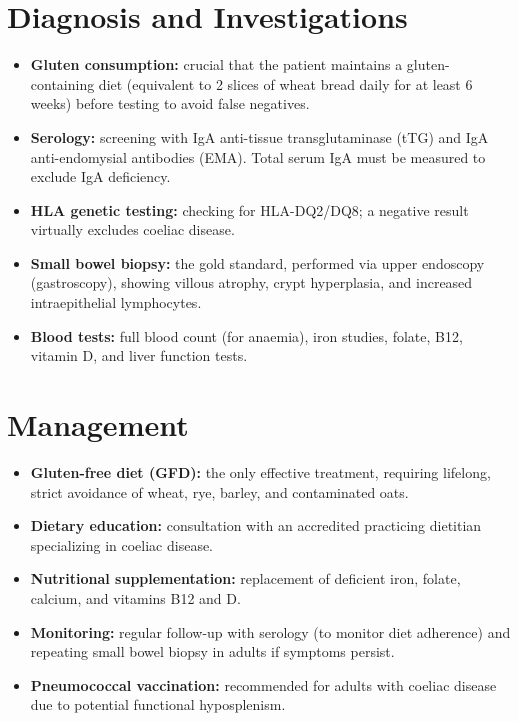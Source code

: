 \section*{Diagnosis and Investigations}
\begin{itemize}
    \item \textbf{Gluten consumption:} crucial that the patient maintains a gluten-containing diet (equivalent to 2 slices of wheat bread daily for at least 6 weeks) before testing to avoid false negatives.
    \item \textbf{Serology:} screening with IgA anti-tissue transglutaminase (tTG) and IgA anti-endomysial antibodies (EMA). Total serum IgA must be measured to exclude IgA deficiency.
    \item \textbf{HLA genetic testing:} checking for HLA-DQ2/DQ8; a negative result virtually excludes coeliac disease.
    \item \textbf{Small bowel biopsy:} the gold standard, performed via upper endoscopy (gastroscopy), showing villous atrophy, crypt hyperplasia, and increased intraepithelial lymphocytes.
    \item \textbf{Blood tests:} full blood count (for anaemia), iron studies, folate, B12, vitamin D, and liver function tests.
\end{itemize}

\section*{Management}
\begin{itemize}
    \item \textbf{Gluten-free diet (GFD):} the only effective treatment, requiring lifelong, strict avoidance of wheat, rye, barley, and contaminated oats.
    \item \textbf{Dietary education:} consultation with an accredited practicing dietitian specializing in coeliac disease.
    \item \textbf{Nutritional supplementation:} replacement of deficient iron, folate, calcium, and vitamins B12 and D.
    \item \textbf{Monitoring:} regular follow-up with serology (to monitor diet adherence) and repeating small bowel biopsy in adults if symptoms persist.
    \item \textbf{Pneumococcal vaccination:} recommended for adults with coeliac disease due to potential functional hyposplenism.
\end{itemize}

